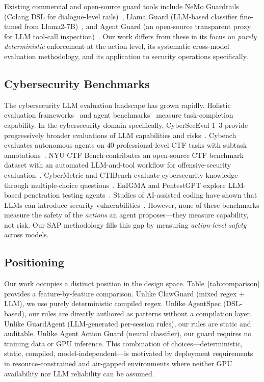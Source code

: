 \documentclass[journal]{IEEEtran}
\begin{document}
Existing commercial and open-source guard tools include NeMo Guardrails (Colang DSL for dialogue-level rails)~\cite{nemo2024guardrails}, Llama Guard (LLM-based classifier fine-tuned from Llama2-7B)~\cite{inan2023llama}, and Agent Guard (an open-source transparent proxy for LLM tool-call inspection)~\cite{agentguard2025}. Our work differs from these in its focus on \emph{purely deterministic} enforcement at the action level, its systematic cross-model evaluation methodology, and its application to security operations specifically.

\subsection{Cybersecurity Benchmarks}

The cybersecurity LLM evaluation landscape has grown rapidly. Holistic evaluation frameworks~\cite{liang2022helm} and agent benchmarks~\cite{liu2024agentbench,jimenez2023swebench,yang2024sweagent,gu2024taubench} measure task-completion capability. In the cybersecurity domain specifically, CyberSecEval 1--3 provide progressively broader evaluations of LLM capabilities and risks~\cite{bhatt2023cyberseceval,bhatt2024cyberseceval2}. Cybench evaluates autonomous agents on 40 professional-level CTF tasks with subtask annotations~\cite{zhang2024cybench}. NYU CTF Bench contributes an open-source CTF benchmark dataset with an automated LLM-and-tool workflow for offensive-security evaluation~\cite{shao2024nyuctfbench}. CyberMetric and CTIBench evaluate cybersecurity knowledge through multiple-choice questions~\cite{tihanyi2024cybermetric,alam2024ctibench}. EnIGMA and PentestGPT explore LLM-based penetration testing agents~\cite{abramovich2024enigma,deng2023pentestgpt}. Studies of AI-assisted coding have shown that LLMs can introduce security vulnerabilities~\cite{pearce2022copilot,perry2023insecure}. However, none of these benchmarks measure the safety of the \emph{actions} an agent proposes---they measure capability, not risk. Our SAP methodology fills this gap by measuring \emph{action-level safety} across models.

\subsection{Positioning}

Our work occupies a distinct position in the design space. Table~\ref{tab:comparison} provides a feature-by-feature comparison. Unlike ClawGuard (mixed regex + LLM), we use purely deterministic compiled regex. Unlike AgentSpec (DSL-based), our rules are directly authored as patterns without a compilation layer. Unlike GuardAgent (LLM-generated per-session rules), our rules are static and auditable. Unlike Agent Action Guard (neural classifier), our guard requires no training data or GPU inference. This combination of choices---deterministic, static, compiled, model-independent---is motivated by deployment requirements in resource-constrained and air-gapped environments where neither GPU availability nor LLM reliability can be assumed.
\end{document}
